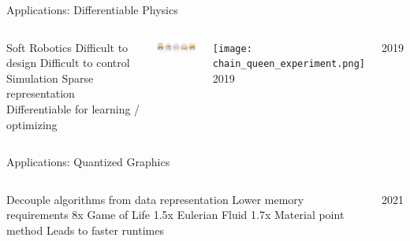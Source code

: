 \placelogofalse
\begin{frame}{Applications: Differentiable Physics}
\begin{columns}
  \centering
  \begin{outline}
    \1 Soft Robotics
    \2 Difficult to design
    \2 Difficult to control
    \1 Simulation
    \2 Sparse representation 
    \2 Differentiable for learning / optimizing
  \end{outline}
  \vspace{0.5cm}
  \includegraphics[width=6cm]{soft_robotics.png}

  \centering
  \begin{center}
  \vspace{0.5cm}
  \texttt{[image: chain\_queen\_experiment.png]}
  2019 \cite{Hu2019chainqueen}
  \end{center}

  \centering
  \begin{center}
  \vspace{0.5cm}
  2019 \cite{Spielberg2019}
  \end{center}
\end{columns}
\end{frame}
\placelogotrue

\placelogofalse
\begin{frame}{Applications: Quantized Graphics}
\begin{columns}
  \begin{outline}
    \1 Decouple algorithms 
    from data representation
    \1 Lower memory requirements
    \2 8x Game of Life
    \2 1.5x Eulerian Fluid
    \2 1.7x Material point method
    \1 Leads to faster runtimes
  \end{outline}

  \centering
  \begin{center}
  2021 \cite{Hu2021} \\
  \vspace{0.3cm}
  \\
  \end{center}
\end{columns}
\end{frame}
\placelogotrue
